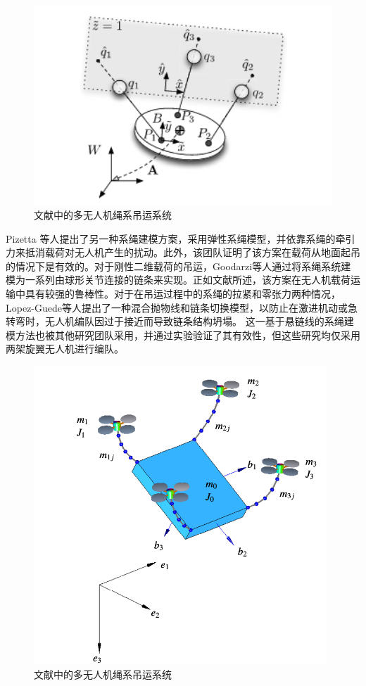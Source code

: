 \documentclass[lang=chs, degree=master, blindreview=true, winfonts=true]{yanputhesis}
\begin{document}
\begin{figure}[hbt!]
	\centering
	\includegraphics[width=28pc]{picture/1_5.png} 
	\caption{文献中的多无人机绳系吊运系统} \label{1_5}
\end{figure}

Pizetta 等人\cite{pizetta2019avoiding}提出了另一种系绳建模方案，采用弹性系绳模型，并依靠系绳的牵引力来抵消载荷对无人机产生的扰动\cite{pizetta2019avoiding}。此外，该团队证明了该方案在载荷从地面起吊的情况下是有效的。对于刚性二维载荷的吊运，Goodarzi等人\cite{c2016stabilization}通过将系绳系统建模为一系列由球形关节连接的链条来实现。正如文献所述，该方案在无人机载荷运输中具有较强的鲁棒性。对于在吊运过程中的系绳的拉紧和零张力两种情况，Lopez-Guede等人\cite{estevez2022hybrid}提出了一种混合抛物线和链条切换模型，以防止在激进机动或急转弯时，无人机编队因过于接近而导致链条结构坍塌。
这一基于悬链线的系绳建模方法也被其他研究团队\cite{d2021catenary,abhishek2021towards}采用，并通过实验验证了其有效性，但这些研究均仅采用两架旋翼无人机进行编队。
\begin{figure}[hbt!]
	\centering
	\includegraphics[width=26pc]{picture/1_6.png} 
	\caption{文献中的多无人机绳系吊运系统} \label{1_6}
\end{figure}
\end{document}
